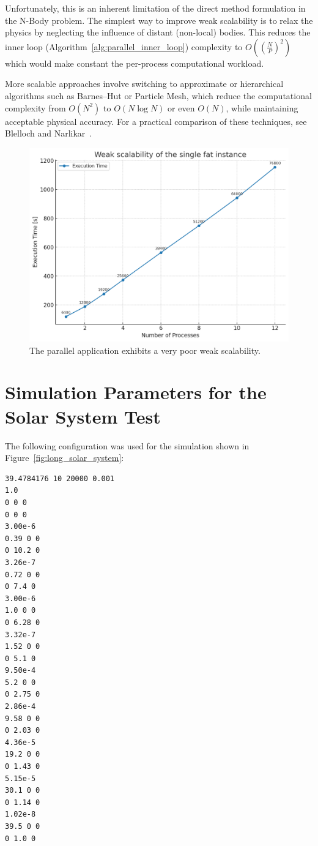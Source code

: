 \documentclass{article}
\begin{document}
Unfortunately, this is an inherent limitation of the direct method formulation in the N-Body problem.
The simplest way to improve weak scalability is to relax the physics by neglecting the influence of distant (non-local) bodies. This reduces the inner loop (Algorithm~\ref{alg:parallel_inner_loop}) complexity to $O((\frac{N}{P})^2)$ which would make constant the per-process computational workload.

More scalable approaches involve switching to approximate or hierarchical algorithms such as Barnes–Hut or Particle Mesh, which reduce the computational complexity from $O(N^2)$ to $O(N \log N)$ or even $O(N)$, while maintaining acceptable physical accuracy. For a practical comparison of these techniques, see Blelloch and Narlikar~\cite{blelloch1997practical}.

\begin{figure}[H]
\centering
\includegraphics[width=0.8\linewidth]{parallel_weak_scalability.png}
\caption{The parallel application exhibits a very poor weak scalability.}
\label{fig:empirical_weak_scalability}
\end{figure}



\appendix


\section[Simulation Parameters (Solar System)]{Simulation Parameters for the Solar System Test}
\label{appendix:solar_params}

The following configuration was used for the simulation shown in Figure~\ref{fig:long_solar_system}:

\begin{verbatim}
39.4784176 10 20000 0.001
1.0
0 0 0
0 0 0
3.00e-6
0.39 0 0
0 10.2 0
3.26e-7
0.72 0 0
0 7.4 0
3.00e-6
1.0 0 0
0 6.28 0
3.32e-7
1.52 0 0
0 5.1 0
9.50e-4
5.2 0 0
0 2.75 0
2.86e-4
9.58 0 0
0 2.03 0
4.36e-5
19.2 0 0
0 1.43 0
5.15e-5
30.1 0 0
0 1.14 0
1.02e-8
39.5 0 0
0 1.0 0
\end{verbatim}
\end{document}
